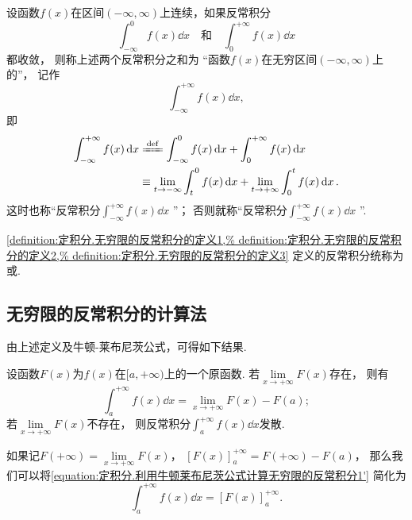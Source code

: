 \begin{definition}\label{definition:定积分.无穷限的反常积分的定义3}
设函数\(f(x)\)在区间\((-\infty,\infty)\)上连续，如果反常积分\[
\int_{-\infty}^0 f(x) \dd{x}
\quad\text{和}\quad
\int_0^{+\infty} f(x) \dd{x}
\]都收敛，%
则称上述两个反常积分之和为%
“函数\(f(x)\)在无穷区间\((-\infty,\infty)\)上的”，%
记作\[
\int_{-\infty}^{+\infty} f(x) \dd{x},
\]
即
\begin{equation}
\begin{split}
\int_{-\infty}^{+\infty} f(x) \dd{x}
&\defeq \int_{-\infty}^0 f(x) \dd{x} + \int_0^{+\infty} f(x) \dd{x} \\
&\equiv \lim\limits_{t \to -\infty} \int_t^0 f(x) \dd{x}
	+ \lim\limits_{t \to +\infty} \int_0^t f(x) \dd{x}.
\end{split}
\end{equation}
这时也称“反常积分\(\int_{-\infty}^{+\infty} f(x) \dd{x}\) ”；
否则就称“反常积分\(\int_{-\infty}^{+\infty} f(x) \dd{x}\) ”.
\end{definition}

\cref{definition:定积分.无穷限的反常积分的定义1,%
definition:定积分.无穷限的反常积分的定义2,%
definition:定积分.无穷限的反常积分的定义3}
定义的反常积分统称为%
或.

\subsection{无穷限的反常积分的计算法}
由上述定义及牛顿-莱布尼茨公式，可得如下结果.
\begin{theorem}\label{theorem:定积分.利用牛顿莱布尼茨公式计算无穷限的反常积分1}
设函数\(F(x)\)为\(f(x)\)在\([a,+\infty)\)上的一个原函数.
若\(\lim\limits_{x \to +\infty} F(x)\)存在，%
则有
\begin{equation}\label{equation:定积分.利用牛顿莱布尼茨公式计算无穷限的反常积分1'}
\int_a^{+\infty} f(x) \dd{x}
=
\lim\limits_{x \to +\infty} F(x) - F(a);
\end{equation}
若\(\lim\limits_{x\to+\infty} F(x)\)不存在，%
则反常积分\(\int_a^{+\infty} f(x) \dd{x}\)发散.
\end{theorem}

如果记\(F(+\infty)=\lim\limits_{x \to +\infty} F(x)\)，%
\([F(x)]_a^{+\infty} = F(+\infty) - F(a)\)，%
那么我们可以将\cref{equation:定积分.利用牛顿莱布尼茨公式计算无穷限的反常积分1'} 简化为
\begin{equation}\label{equation:定积分.利用牛顿莱布尼茨公式计算无穷限的反常积分1}
\int_a^{+\infty} f(x) \dd{x} = [F(x)]_a^{+\infty}.
\end{equation}

